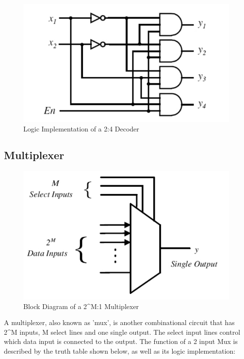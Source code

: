 \begin{figure}[H]
  \begin{centering}
  \includegraphics[scale=1]{decoderlogic.png}
  \par\end{centering}
  \caption{Logic Implementation of a 2:4 Decoder}
\end{figure}


\subsection*{Multiplexer}

\begin{figure}[H]
  \begin{centering}
  \includegraphics[scale=1]{mux.png}
  \par\end{centering}
  \caption{Block Diagram of a 2^{M}:1 Multiplexer}
\end{figure}

A multiplexer, also known as 'mux', is another combinational circuit that has 2^{M} inputs, M select lines and one single output. The select input lines control which data input is connected to the output. The function of a 2 input Mux is described by the truth table shown below, as well as its logic implementation:


